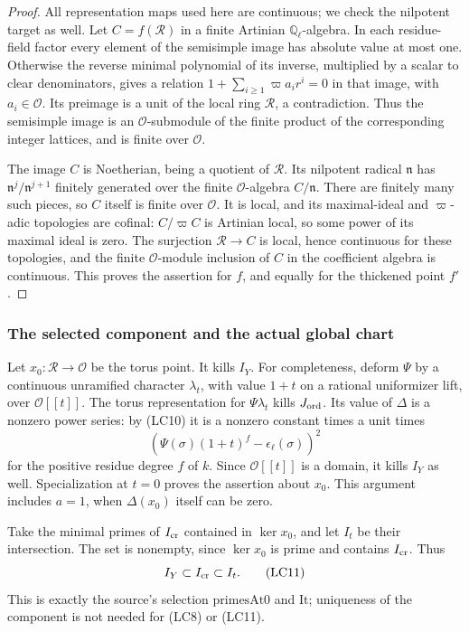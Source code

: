 \begin{proof}
All representation maps used here are continuous;
we check the nilpotent target as well.
Let \(C=f(\mathcal R)\) in a finite Artinian
\(\mathbb Q_\ell\)-algebra.
In each residue-field factor every element of the
semisimple image has absolute value at most one.
Otherwise the reverse minimal polynomial of its inverse,
multiplied by a scalar to clear denominators, gives a
relation
\(1+\sum_{i\ge1}\varpi a_i r^i=0\) in that image,
with \(a_i\in\mathcal O\).
Its preimage is a unit of the local ring \(\mathcal R\),
a contradiction.
Thus the semisimple image is an \(\mathcal O\)-submodule
of the finite product of the corresponding integer
lattices, and is finite over \(\mathcal O\).

The image \(C\) is Noetherian, being a quotient of
\(\mathcal R\).
Its nilpotent radical \(\mathfrak n\) has
\(\mathfrak n^j/\mathfrak n^{j+1}\) finitely generated
over the finite \(\mathcal O\)-algebra \(C/\mathfrak n\).
There are finitely many such pieces, so \(C\) itself is
finite over \(\mathcal O\).
It is local, and its maximal-ideal and
\(\varpi\)-adic topologies are cofinal:
\(C/\varpi C\) is Artinian local, so some power of its
maximal ideal is zero.
The surjection \(\mathcal R\to C\) is local, hence
continuous for these topologies, and the finite
\(\mathcal O\)-module inclusion of \(C\) in the
coefficient algebra is continuous.
This proves the assertion for \(f\), and equally for
the thickened point \(f'\).
\end{proof}

\subsubsection{The selected component and the actual global chart}
Let \(x_0:\mathcal R\to\mathcal O\) be the torus point.
It kills \(I_Y\).
For completeness, deform \(\Psi\) by a continuous unramified
character \(\lambda_t\), with value \(1+t\) on a rational
uniformizer lift, over \(\mathcal O[[t]]\).
The torus representation for \(\Psi\lambda_t\) kills
\(J_{\rm ord}\).
Its value of \(\Delta\) is a nonzero power series:
by (LC10) it is a nonzero constant times a unit times
\[
        \left(\Psi(\sigma)(1+t)^f
                                      -\epsilon_\ell(\sigma)\right)^2
\]
for the positive residue degree \(f\) of \(k\).
Since \(\mathcal O[[t]]\) is a domain, it kills \(I_Y\)
as well.
Specialization at \(t=0\) proves the assertion about \(x_0\).
This argument includes \(a=1\), when \(\Delta(x_0)\)
itself can be zero.

Take the minimal primes of \(I_{\rm cr}\) contained in
\(\ker x_0\), and let \(I_t\) be their intersection.
The set is nonempty, since \(\ker x_0\) is prime and contains
\(I_{\rm cr}\).
Thus
\[
                       I_Y\subset I_{\rm cr}\subset I_t.
 \tag{LC11}
\]
This is exactly the source's selection \(\mathrm{primesAt0}\)
and \(\mathrm{It}\); uniqueness of the component is not
needed for (LC8) or (LC11).


